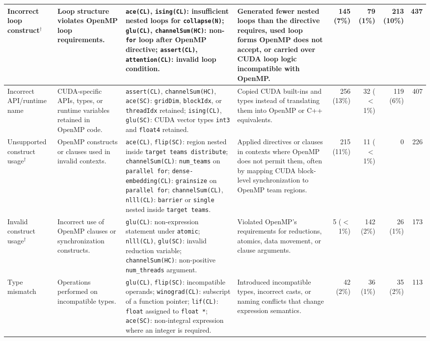 \begin{table}[!t]
\begin{tabular}{@{}>{\raggedright\arraybackslash}p{1.9cm}>{\raggedright\arraybackslash}p{2.2cm}>{\raggedright\arraybackslash}p{4.9cm}>{\raggedright\arraybackslash}p{3.1cm}rrrr@{}}
\midrule
Incorrect loop construct$^\dagger$ & Loop structure violates OpenMP loop requirements. & \texttt{ace(CL)}, \texttt{ising(CL)}: insufficient nested loops for \texttt{collapse(N)}; \texttt{glu(CL)}, \texttt{channelSum(HC)}: non-\texttt{for} loop after OpenMP directive; \texttt{assert(CL)}, \texttt{attention(CL)}: invalid loop condition. & Generated fewer nested loops than the directive requires, used loop forms OpenMP does not accept, or carried over CUDA loop logic incompatible with OpenMP. & 145 (7\%) & 79 (1\%) & 213 (10\%) & 437 \\
\midrule
Incorrect API/runtime name & CUDA-specific APIs, types, or runtime variables retained in OpenMP code. & \texttt{assert(CL)}, \texttt{channelSum(HC)}, \texttt{ace(SC)}: \texttt{gridDim}, \texttt{blockIdx}, or \texttt{threadIdx} retained; \texttt{ising(CL)}, \texttt{glu(SC)}: CUDA vector types \texttt{int3} and \texttt{float4} retained. & Copied CUDA built-ins and types instead of translating them into OpenMP or C++ equivalents. & 256 (13\%) & 32 ($<$1\%) & 119 (6\%) & 407 \\
\midrule
Unsupported construct usage$^\dagger$ & OpenMP constructs or clauses used in invalid contexts. & \texttt{ace(CL)}, \texttt{flip(SC)}: region nested inside \texttt{target teams distribute}; \texttt{channelSum(CL)}: \texttt{num\_teams} on \texttt{parallel for}; \texttt{dense-embedding(CL)}: \texttt{grainsize} on \texttt{parallel for}; \texttt{channelSum(CL)}, \texttt{nlll(CL)}: \texttt{barrier} or \texttt{single} nested inside \texttt{target teams}. & Applied directives or clauses in contexts where OpenMP does not permit them, often by mapping CUDA block-level synchronization to OpenMP team regions. & 215 (11\%) & 11 ($<$1\%) & 0 & 226 \\
\midrule
Invalid construct usage$^\dagger$ & Incorrect use of OpenMP clauses or synchronization constructs. & \texttt{glu(CL)}: non-expression statement under \texttt{atomic}; \texttt{nlll(CL)}, \texttt{glu(SC)}: invalid reduction variable; \texttt{channelSum(HC)}: non-positive \texttt{num\_threads} argument. & Violated OpenMP's requirements for reductions, atomics, data movement, or clause arguments. & 5 ($<$1\%) & 142 (2\%) & 26 (1\%) & 173 \\
\midrule
Type mismatch & Operations performed on incompatible types. & \texttt{glu(CL)}, \texttt{flip(SC)}: incompatible operands; \texttt{winograd(CL)}: subscript of a function pointer; \texttt{lif(CL)}: \texttt{float} assigned to \texttt{float *}; \texttt{ace(SC)}: non-integral expression where an integer is required. & Introduced incompatible types, incorrect casts, or naming conflicts that change expression semantics. & 42 (2\%) & 36 (1\%) & 35 (2\%) & 113 \\

\end{tabular}
\end{table}
